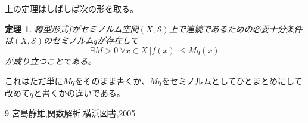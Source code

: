 \documentclass[leqno]{jsarticle}
\newtheorem{thm}{定理}
\newcommand{\s}{\mathcal{S}}
\begin{document}
上の定理はしばしば次の形を取る。


\begin{thm}
線型形式$f$がセミノルム空間$(X,\s)$上で連続であるための必要十分条件は$(X,\s)$のセミノルム$q$が存在して
\[
\exists M>0\ \forall x\in X \ |f(x)|\le Mq(x)
\]が成り立つことである。
\end{thm}

これはただ単に$Mq$をそのまま書くか、$Mq$をセミノルムとしてひとまとめにして改めて$q$と書くかの違いである。












	
\begin{thebibliography}{9}
宮島静雄,関数解析,横浜図書,2005
\end{thebibliography}




			
\end{document}
